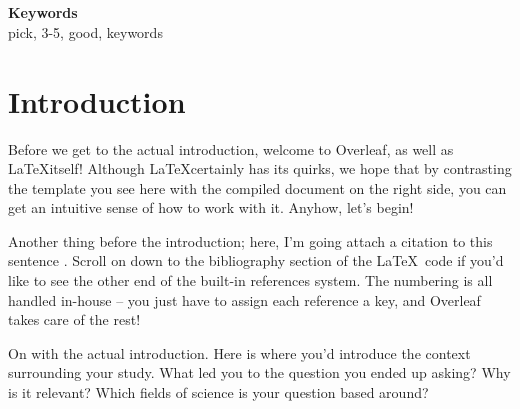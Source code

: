 \begin{abstract}
Your abstract will get published whether or not your team wins the challenge, so make sure to do a good job! It should reflect the objectives, methodology and findings of the research project. When writing your abstract, choose the right (amount of) words to convey your information. Avoid long sentences and long-winded explanations as they could make the reader lose focus. The order of your writing is also important. Maintain a logical order to your writing so that the reader links each aspect of your work coherently. Introduction/Background: Explains what problem the study examined and why. You may provide some background to the project, and the motivation behind it. Materials and Methods: Describes the data sources used and methodologies adopted for the data analysis. Key Findings/Results: Outlines the discoveries/what was observed from the analysis. When describing your results, strive to focus on the main finding(s), and list no more than two or three points. Conclusion: Provide a general interpretation of the results, specifying what is new/innovative of your project, and give any important recommendation for future research.Once you've written these, delete the keywords, edit for flow, and you have your abstract. The word limit for this is 250 words.
\end{abstract} \\ 
\\ 
{\textbf{Keywords} \\
pick, 3-5, good, keywords}

\section{Introduction}
Before we get to the actual introduction, welcome to Overleaf, as well as \LaTeX itself! Although \LaTeX certainly has its quirks, we hope that by contrasting the template you see here with the compiled document on the right side, you can get an intuitive sense of how to work with it. Anyhow, let's begin!

Another thing before the introduction; here, I'm going attach a citation to this sentence \cite{ReferenceName}. Scroll on down to the bibliography section of the \LaTeX\ code if you'd like to see the other end of the built-in references system. The numbering is all handled in-house -- you just have to assign each reference a key, and Overleaf takes care of the rest!

On with the actual introduction. Here is where you'd introduce the context surrounding your study. What led you to the question you ended up asking? Why is it relevant? Which fields of science is your question based around?

